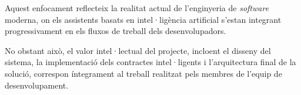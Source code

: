 Aquest enfocament reflecteix la realitat actual de l'enginyeria de \textit{software} moderna, on els assistents basats en intel·ligència artificial s'estan integrant progressivament en els fluxos de treball dels desenvolupadors.

No obstant això, el valor intel·lectual del projecte, incloent el disseny del sistema, la implementació dels contractes intel·ligents i l'arquitectura final de la solució, correspon íntegrament al treball realitzat pels membres de l'equip de desenvolupament.